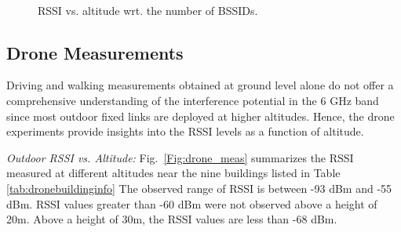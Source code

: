 \documentclass[sigconf,10pt]{acmart}
\begin{document}
\begin{figure}
     \centering
     \begin{subfigure}[$N_{BSSID} 
 = 368 $]{  
     \centering
    \texttt{[image: Figures/scatter\_fig2\_MLB.pdf]}
         \label{Fig:mlb}}
    \end{subfigure} \hspace{-8mm}
     \begin{subfigure}[$N_{BSSID}  
 = 800 $]{
         \centering
         \texttt{[image: Figures/scatter\_fig4\_DS.pdf]}
        \label{Fig:ds}}
     \end{subfigure} \\ \vspace{-1em}
       \begin{subfigure}[$N_{BSSID} 
 = 68$]{  
     \centering
    \texttt{[image: Figures/scatter\_fig5\_hill.pdf]}
         \label{Fig:hilla}}
    \end{subfigure}\hspace{-5mm}
     \begin{subfigure}[$N_{BSSID} 
 = 92 $]{
         \centering
         \texttt{[image: Figures/scatter\_fig6\_PC.pdf]}
        \label{Fig:pc}}
     \end{subfigure} \vspace{-1em}
    \caption{RSSI vs. altitude wrt. the number of BSSIDs.}
    \label{Fig:meas_locs_four}
    \vspace{-1.5em}
\end{figure}

\subsection{Drone Measurements}
Driving and walking measurements obtained at ground level alone do not offer a comprehensive understanding of the interference potential in the 6 GHz band since most outdoor fixed links are deployed at higher altitudes. Hence, the drone experiments provide insights into the RSSI levels as a function of altitude.

{\it Outdoor RSSI vs. Altitude:} Fig.~\ref{Fig:drone_meas} summarizes the RSSI measured at different altitudes near the nine buildings listed in Table \ref{tab:dronebuildinginfo}
The observed range of RSSI is between -93 dBm and -55 dBm. RSSI values greater than -60 dBm were not observed above a height of  20m.  Above a height of 30m, the RSSI values are less than -68 dBm. 
\end{document}
